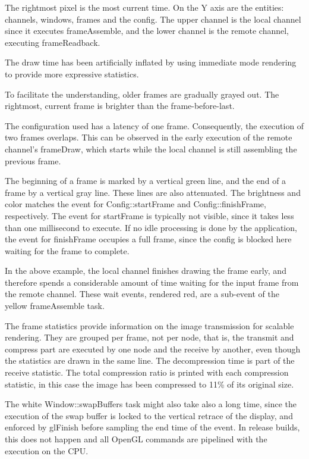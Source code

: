 \documentclass[10pt,a4]{scrartcl}
\begin{document}
The rightmost pixel is the most current time. On the Y axis are the
entities: channels, windows, frames and the config. The upper channel is
the local channel since it executes \textsf{frameAssemble}, and the
lower channel is the remote channel, executing \textsf{frameReadback}.

The draw time has been artificially inflated by using immediate mode
rendering to provide more expressive statistics.

To facilitate the understanding, older frames are gradually grayed
out. The rightmost, current frame is brighter than the
frame-before-last.

The configuration used has a latency of one frame. Consequently, the
execution of two frames overlaps. This can be observed in the early
execution of the remote channel's \textsf{frameDraw}, which starts while
the local channel is still assembling the previous frame.

The beginning of a frame is marked by a vertical green line, and the end
of a frame by a vertical gray line. These lines are also attenuated. The
brightness and color matches the event for \textsf{Config::startFrame}
and \textsf{Config::finishFrame}, respectively. The event for
\textsf{startFrame} is typically not visible, since it takes less than
one millisecond to execute. If no idle processing is done by the
application, the event for \textsf{finishFrame} occupies a full frame,
since the config is blocked here waiting for the frame to complete.

In the above example, the local channel finishes drawing the frame
early, and therefore spends a considerable amount of time waiting for
the input frame from the remote channel. These wait events, rendered
red, are a sub-event of the yellow \textsf{frameAssemble} task.

The frame statistics provide information on the image transmission for
scalable rendering. They are grouped per frame, not per node, that is,
the transmit and compress part are executed by one node and the receive
by another, even though the statistics are drawn in the same line. The
decompression time is part of the receive statistic. The total
compression ratio is printed with each compression statistic, in this
case the image has been compressed to 11\% of its original size.

The white \textsf{Window::swapBuffers} task might also take also a long
time, since the execution of the swap buffer is locked to the vertical
retrace of the display, and enforced by \textsf{glFinish} before
sampling the end time of the event. In release builds, this does not
happen and all OpenGL commands are pipelined with the execution on the
CPU.
\end{document}
